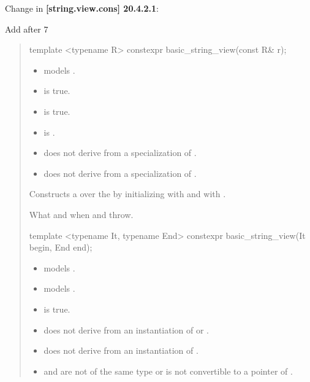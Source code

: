 \documentclass{wg21}
\begin{document}
Change in \textbf{[string.view.cons] 20.4.2.1}:

Add after 7

\begin{quote}
\begin{addedblock}
\begin{itemdecl}
template <typename R>
constexpr basic_string_view(const R& r);

\end{itemdecl}

\begin{itemdescr}
    \constraints
    \begin{itemize}
        \item {} models .
        \item {} is true.
        \item {} is true.
        \item {} is .
        \item {} does not derive from a specialization of .
        \item {} does not derive from a specialization of .
    \end{itemize}

    \effects
    Constructs a  over the   by initializing  with  and  with .


    \throws
    What and when  and  throw.



\end{itemdescr}

\begin{itemdecl}
template <typename It, typename End>
constexpr basic_string_view(It begin, End end);

\end{itemdecl}

\begin{itemdescr}
    \constraints
    \begin{itemize}
        \item {} models .
        \item {} models .
        \item {} is true.
        \item {} does not derive from an instantiation of   or  .
        \item {} does not derive from an instantiation of    .
        \item {} and  are not of the same type or  is not convertible to a pointer of .
    \end{itemize}


\end{itemdescr}
\end{addedblock}
\end{quote}
\end{document}
